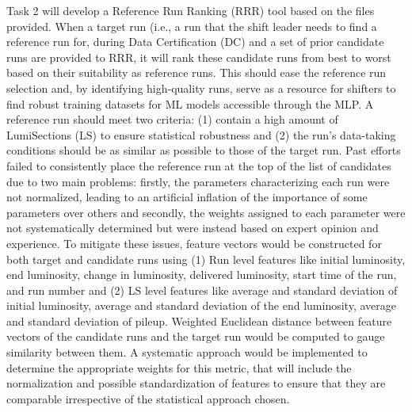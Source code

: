 Task 2 will develop a Reference Run Ranking (RRR) tool based on the files provided. When a target run (i.e., a run that the shift leader needs to find a reference run for, during Data Certification (DC) and a set of prior candidate runs are provided to RRR, it will rank these candidate runs from best to worst based on their suitability as reference runs. This should ease the reference run selection and, by identifying high-quality runs, serve as a resource for shifters to find robust training datasets for ML models accessible through the MLP. A reference run should meet two criteria: (1) contain a high amount of LumiSections (LS) to ensure statistical robustness and (2) the run’s data-taking conditions should be as similar as possible to those of the target run.
Past efforts failed to consistently place the reference run at the top of the list of candidates due to two main problems: firstly, the parameters characterizing each run were not normalized, leading to an artificial inflation of the importance of some parameters over others and secondly, the weights assigned to each parameter were not systematically determined but were instead based on expert opinion and experience. To mitigate these issues, feature vectors would be constructed for both target and candidate runs using (1) Run level features like initial luminosity, end luminosity, change in luminosity, delivered luminosity, start time of the run, and run number and (2) LS level features like average and standard deviation of initial luminosity, average and standard deviation of the end luminosity, average and standard deviation of pileup. Weighted Euclidean distance between feature vectors of the candidate runs and the target run would be computed to gauge similarity between them. A systematic approach would be implemented to determine the appropriate weights for this metric, that will include the normalization and possible standardization of features to ensure that they are comparable irrespective of the statistical approach chosen.

